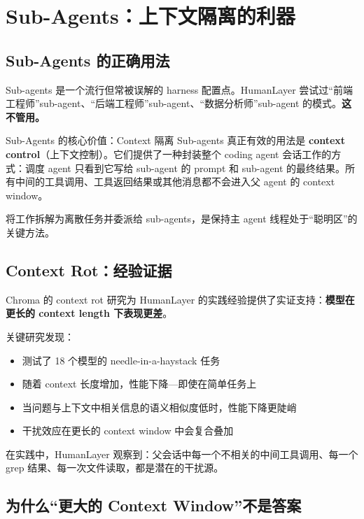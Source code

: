 \section{Sub-Agents：上下文隔离的利器}

\subsection{Sub-Agents 的正确用法}

Sub-agents 是一个流行但常被误解的 harness 配置点。HumanLayer 尝试过``前端工程师''sub-agent、``后端工程师''sub-agent、``数据分析师''sub-agent 的模式。\textbf{这不管用。}

\begin{importantbox}{Sub-Agents 的核心价值：Context 隔离}
Sub-agents 真正有效的用法是 \textbf{context control}（上下文控制）。它们提供了一种封装整个 coding agent 会话工作的方式：调度 agent 只看到它写给 sub-agent 的 prompt 和 sub-agent 的最终结果。所有中间的工具调用、工具返回结果或其他消息都不会进入父 agent 的 context window。

将工作拆解为离散任务并委派给 sub-agents，是保持主 agent 线程处于``聪明区''的关键方法。
\end{importantbox}

\subsection{Context Rot：经验证据}

Chroma 的 context rot 研究为 HumanLayer 的实践经验提供了实证支持：\textbf{模型在更长的 context length 下表现更差}。

关键研究发现：
\begin{itemize}[leftmargin=1.5em]
    \item 测试了 18 个模型的 needle-in-a-haystack 任务
    \item 随着 context 长度增加，性能下降---即使在简单任务上
    \item 当问题与上下文中相关信息的语义相似度低时，性能下降更陡峭
    \item 干扰效应在更长的 context window 中会复合叠加
\end{itemize}

在实践中，HumanLayer 观察到：父会话中每一个不相关的中间工具调用、每一个 grep 结果、每一次文件读取，都是潜在的干扰源。

\subsection{为什么``更大的 Context Window''不是答案}

